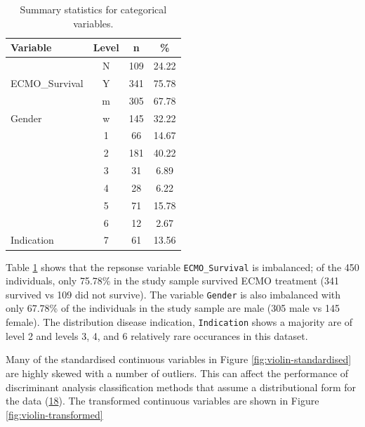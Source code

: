 \documentclass[12pt,]{article}
\begin{document}
\begin{table}[!h]

\caption{\label{tab:unnamed-chunk-3}\label{tab:categorical-summaries} Summary statistics for categorical variables.}
\centering
\fontsize{10}{12}\selectfont
\begin{tabular}{lccc}
\toprule
Variable & Level & n & \%\\
\midrule
 & N & 109 & 24.22\\

\multirow{-2}{*}{\raggedright\arraybackslash ECMO\_Survival} & Y & 341 & 75.78\\
\cmidrule{1-4}
 & m & 305 & 67.78\\

\multirow{-2}{*}{\raggedright\arraybackslash Gender} & w & 145 & 32.22\\
\cmidrule{1-4}
 & 1 & 66 & 14.67\\

 & 2 & 181 & 40.22\\

 & 3 & 31 & 6.89\\

 & 4 & 28 & 6.22\\

 & 5 & 71 & 15.78\\

 & 6 & 12 & 2.67\\

\multirow{-7}{*}{\raggedright\arraybackslash Indication} & 7 & 61 & 13.56\\
\bottomrule
\end{tabular}
\end{table}

Table \ref{tab:categorical-summaries} shows that the repsonse variable
\texttt{ECMO\_Survival} is imbalanced; of the 450 individuals, only
75.78\% in the study sample survived ECMO treatment (341 survived vs 109
did not survive). The variable \texttt{Gender} is also imbalanced with
only 67.78\% of the individuals in the study sample are male (305 male
vs 145 female). The distribution disease indication, \texttt{Indication}
shows a majority are of level 2 and levels 3, 4, and 6 relatively rare
occurances in this dataset.

Many of the standardised continuous variables in Figure
\ref{fig:violin-standardised} are highly skewed with a number of
outliers. This can affect the performance of discriminant analysis
classification methods that assume a distributional form for the data
(\protect\hyperlink{ref-hastie_elements_2009}{18}). The transformed
continuous variables are shown in Figure \ref{fig:violin-transformed}
\end{document}
